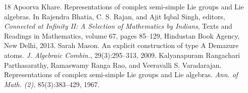 \documentclass[reqno]{amsart}
\theoremstyle{definition}
\theoremstyle{remark}
\numberwithin{equation}{section}
\begin{document}
\begin{thebibliography}{18}
		Apoorva Khare. Representations of complex semi-simple Lie groups and Lie algebras. In Rajendra Bhatia, C. S. Rajan, and Ajit Iqbal Singh, editors, \textit{Connected at Infinity II: A Selection of Mathematics by Indians}, Texts and Readings in Mathematics, volume 67, pages 85--129, Hindustan Book Agency, New Delhi, 2013.
		Sarah Mason. An explicit construction of type A Demazure atoms. \textit{J. Algebraic Combin.}, 29(3):295--313, 2009.
		Kalyanapuram Rangachari Parthasarathy, Ramaswamy Ranga Rao, and Veeravalli S. Varadarajan. Representations of complex semi-simple Lie groups and Lie algebras. \textit{Ann. of Math. (2)}, 85(3):383--429, 1967.
		
	\end{thebibliography}
	
\end{document}
